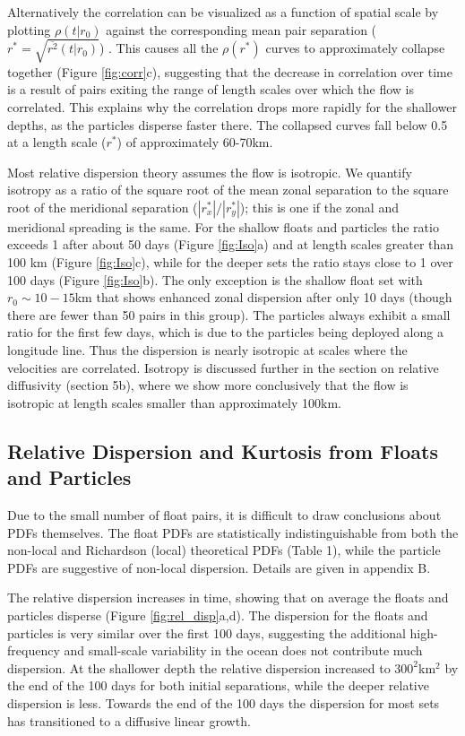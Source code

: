 \documentclass[]{ametsoc}
\begin{document}
Alternatively the correlation can be visualized as a function of spatial scale by plotting $\rho (t|r_0)$ against the corresponding mean pair separation ($r^* = \sqrt{\overline{r^2}(t|r_0)}$) \citep{koszalka2011surface, graff2015relative}. %
This causes all the $\rho (r^*)$ curves to approximately collapse together (Figure \ref{fig:corr}c), suggesting that the decrease in correlation over time is a result of pairs exiting the range of length scales over which the flow is correlated. This explains why the correlation drops more rapidly for the shallower depths, as the particles disperse faster there. The collapsed curves fall below 0.5 at a length scale ($r^*$) of approximately 60-70km. 

Most relative dispersion theory assumes the flow is isotropic. We quantify isotropy as a ratio of the square root of the mean zonal separation to the square root of the meridional separation ($|r^*_x|/|r^*_y|$)\citep {morel1974relative}; this is one if the zonal and meridional spreading is the same. For the shallow floats and particles the ratio exceeds 1 after about 50 days (Figure \ref{fig:Iso}a) and at length scales greater than 100 km (Figure \ref{fig:Iso}c), while for the deeper sets the ratio stays close to 1 over 100 days (Figure \ref{fig:Iso}b). The only exception is the shallow float set with $r_0 \sim 10-15$km that shows enhanced zonal dispersion after only 10 days (though there are fewer than 50 pairs in this group). The particles always exhibit a small ratio for the first few days, which is due to the particles being deployed along a longitude line. Thus the dispersion is nearly isotropic at scales where the velocities are correlated. Isotropy is discussed further in the section on relative diffusivity (section 5b), where we show more conclusively that the flow is isotropic at length scales smaller than approximately 100km.

\subsection{Relative Dispersion and Kurtosis from Floats and Particles} 
Due to the small number of float pairs, it is difficult to draw conclusions about PDFs themselves. The float PDFs are statistically indistinguishable from both the non-local and Richardson (local) theoretical PDFs (Table 1), while the particle PDFs are suggestive of non-local dispersion. Details are given in appendix B.

The relative dispersion increases in time, showing that on average the floats and particles disperse (Figure \ref{fig:rel_disp}a,d). The dispersion for the floats and particles is very similar over the first 100 days, suggesting the additional high-frequency and small-scale variability in the ocean does not contribute much dispersion. At the shallower depth the relative dispersion increased to $300^2$km$^2$ by the end of the 100 days for both initial separations, while the deeper relative dispersion is less. Towards the end of the 100 days the dispersion for most sets has transitioned to a diffusive linear growth.
\end{document}
